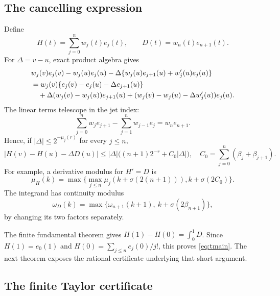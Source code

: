 \documentclass[11pt]{article}
\theoremstyle{definition}
\begin{document}
\subsection{The cancelling expression}

Define
\begin{equation}\label{eq:H}
 H(t)=\sum_{j=0}^{n}w_j(t)e_j(t),\qquad D(t)=w_n(t)e_{n+1}(t).
\end{equation}
For \(\Delta=v-u\), exact product algebra gives
\begin{align}
 &w_j(v)e_j(v)-w_j(u)e_j(u)
     -\Delta\{w_j(u)e_{j+1}(u)+w_j'(u)e_j(u)\}\notag\\
 &=w_j(v)\{e_j(v)-e_j(u)-\Delta e_{j+1}(u)\}\notag\\
 &\quad+\Delta(w_j(v)-w_j(u))e_{j+1}(u)
       +(w_j(v)-w_j(u)-\Delta w_j'(u))e_j(u).\label{eq:productsplit}
\end{align}
The linear terms telescope in the jet index:
\begin{equation}\label{eq:jetcancel}
 \sum_{j=0}^{n}w_je_{j+1}-\sum_{j=1}^{n}w_{j-1}e_j=w_ne_{n+1}.
\end{equation}
Hence, if \(|\Delta|\le2^{-\mu_j(r)}\) for every \(j\le n\),
\begin{equation}\label{eq:Herror}
 |H(v)-H(u)-\Delta D(u)|
 \le|\Delta|\bigl((n+1)2^{-r}+C_0|\Delta|\bigr),\quad
 C_0=\sum_{j=0}^{n}(\beta_j+\beta_{j+1}).
\end{equation}
For example, a derivative modulus for \(H'=D\) is
\[
 \mu_H(k)=\max\{\max_{j\le n}\mu_j(k+\sigma(2(n+1))),
                                      k+\sigma(2C_0)\}.
\]
The integrand has continuity modulus
\[
 \omega_D(k)=\max\{\omega_{n+1}(k+1),\
                                  k+\sigma(2\beta_{n+1})\},
\]
by changing its two factors separately.

The finite fundamental theorem gives \(H(1)-H(0)=\int_0^1D\).
Since \(H(1)=e_0(1)\) and \(H(0)=\sum_{j\le n}e_j(0)/j!\),
this proves \eqref{eq:tmain}. The next theorem exposes the rational
certificate underlying that short argument.

\subsection{The finite Taylor certificate}\label{sec:tcertificate}
\end{document}
